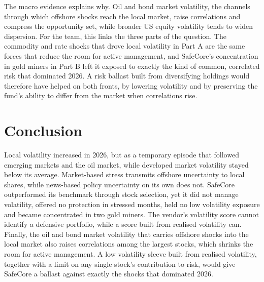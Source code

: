 \documentclass[11pt,preprint]{elsarticle}
\numberwithin{equation}{section}
\numberwithin{figure}{section}
\numberwithin{table}{section}
\begin{document}
The macro evidence explains why. Oil and bond market volatility, the
channels through which offshore shocks reach the local market, raise
correlations and compress the opportunity set, while broader US equity
volatility tends to widen dispersion. For the team, this links the three
parts of the question. The commodity and rate shocks that drove local
volatility in Part A are the same forces that reduce the room for active
management, and SafeCore's concentration in gold miners in Part B left
it exposed to exactly the kind of common, correlated risk that dominated
2026. A risk ballast built from diversifying holdings would therefore
have helped on both fronts, by lowering volatility and by preserving the
fund's ability to differ from the market when correlations rise.

\FloatBarrier

\section{\texorpdfstring{Conclusion
\label{Conclusion}}{Conclusion }}\label{conclusion}

Local volatility increased in 2026, but as a temporary episode that
followed emerging markets and the oil market, while developed market
volatility stayed below its average. Market-based stress transmits
offshore uncertainty to local shares, while news-based policy
uncertainty on its own does not. SafeCore outperformed its benchmark
through stock selection, yet it did not manage volatility, offered no
protection in stressed months, held no low volatility exposure and
became concentrated in two gold miners. The vendor's volatility score
cannot identify a defensive portfolio, while a score built from realised
volatility can. Finally, the oil and bond market volatility that carries
offshore shocks into the local market also raises correlations among the
largest stocks, which shrinks the room for active management. A low
volatility sleeve built from realised volatility, together with a limit
on any single stock's contribution to risk, would give SafeCore a
ballast against exactly the shocks that dominated 2026.


\end{document}
